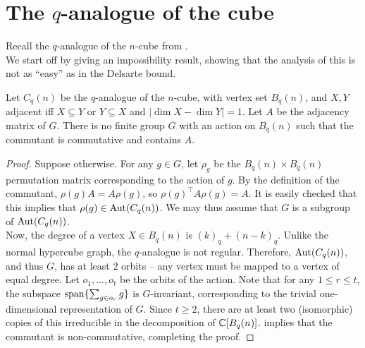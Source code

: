 
\clearpage
\section{The $q$-analogue of the cube}

Recall the $q$-analogue of the $n$-cube from .\\
We start off by giving an impossibility result, showing that the analysis of this is not as ``easy'' as in the Delsarte bound.

\begin{ftheo}
	Let $C_q(n)$ be the $q$-analogue of the $n$-cube, with vertex set $B_q(n)$, and $X,Y$ adjacent iff $X \subseteq Y$ or $Y \subseteq X$ and $|\dim X - \dim Y| = 1$. Let $A$ be the adjacency matrix of $G$. There is no finite group $G$ with an action on $B_q(n)$ such that the commutant is commutative and contains $A$.
\end{ftheo}
\begin{proof}
	Suppose otherwise. For any $g \in G$, let $\rho_g$ be the $B_q(n) \times B_q(n)$ permutation matrix corresponding to the action of $g$. By the definition of the commutant, $\rho(g) A = A \rho(g)$, so $\rho(g)^\top A \rho(g) = A$. It is easily checked that this implies that $\rho(g) \in \operatorname{Aut}(C_q(n))$. We may thus assume that $G$ is a subgroup of $\operatorname{Aut}(C_q(n))$.\\
	Now, the degree of a vertex $X \in B_q(n)$ is $(k)_q + (n-k)_q$. Unlike the normal hypercube graph, the $q$-analogue is not regular. Therefore, $\operatorname{Aut}(C_q(n))$, and thus $G$, has at least $2$ orbits -- any vertex must be mapped to a vertex of equal degree. Let $o_1,\ldots,o_t$ be the orbits of the action. Note that for any $1 \le r \le t$, the subspace $\operatorname{span}\{\sum_{g \in o_r} g\}$ is $G$-invariant, corresponding to the trivial one-dimensional representation of $G$. Since $t \ge 2$, there are at least two (isomorphic) copies of this irreducible in the decomposition of $\mathbb{C}[B_q(n)]$.  implies that the commutant is non-commutative, completing the proof.
\end{proof}